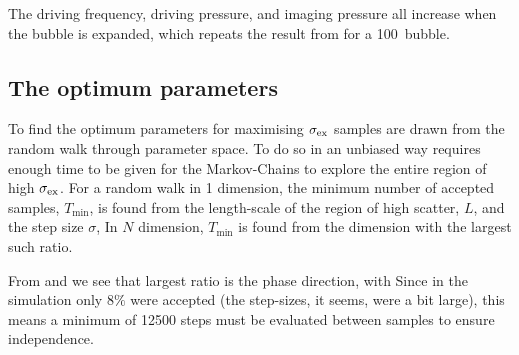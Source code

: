 The  driving frequency, driving pressure, and imaging pressure all increase when the bubble is expanded,
which repeats the result from  for a \unit{100}\nano\metre\ bubble.




\subsection{The optimum parameters}
To find the optimum parameters for maximising $\sigma_\textrm{ex}$ 
samples are drawn from the random walk through parameter space.
To do so in an unbiased way requires enough time to be given for the Markov-Chains 
to explore the entire region of high $\sigma_\textrm{ex}$.
For a random walk in 1 dimension, 
the minimum number of accepted samples, $T_{\textrm{min}}$, is found from 
the length-scale of the region of high scatter, $L$, and the step size $\sigma$, 
In $N$ dimension, $T_{\textrm{min}}$ is found from the dimension with the largest such ratio.


From  and 
we see that largest ratio is the phase direction,
with 
Since in the simulation only $8\%$ were accepted (the step-sizes, it seems, were a bit large), this means a minimum
of 12500 steps must be evaluated between samples to ensure independence.


